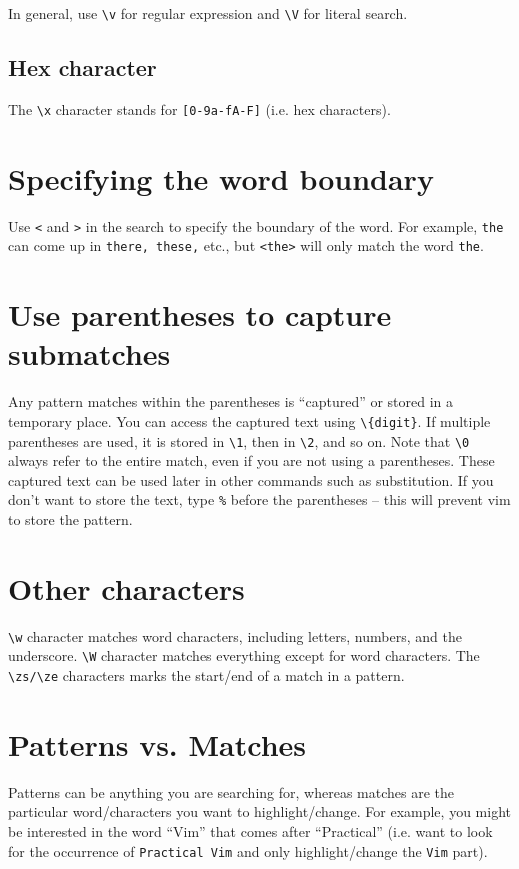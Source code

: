 In general, use \verb|\v| for regular expression and \verb|\V| for literal search.

\subsection{Hex character}

The \verb|\x| character stands for \verb|[0-9a-fA-F]| (i.e. hex characters).

\section{Specifying the word boundary}

Use \verb|<| and \verb|>| in the search to specify the boundary of the word.
For example, \verb|the| can come up in \verb|there, these,| etc., but \verb|<the>| will only match the word \verb|the|.

\section{Use parentheses to capture submatches}

Any pattern matches within the parentheses is ``captured'' or stored in a temporary place.
You can access the captured text using \verb|\{digit}|.
If multiple parentheses are used, it is stored in \verb|\1|, then in \verb|\2|, and so on.
Note that \verb|\0| always refer to the entire match, even if you are not using a parentheses.
These captured text can be used later in other commands such as substitution.
If you don't want to store the text, type \verb|%| before the parentheses -- this will prevent vim to store the pattern.

\section{Other characters}

\verb|\w| character matches word characters, including letters, numbers, and the underscore.
\verb|\W| character matches everything except for word characters.
The \verb|\zs/\ze| characters marks the start/end of a match in a pattern.

\section{Patterns vs. Matches}

Patterns can be anything you are searching for, whereas matches are the particular word/characters you want to highlight/change.
For example, you might be interested in the word ``Vim'' that comes after ``Practical'' (i.e. want to look for the occurrence of \verb|Practical Vim| and only highlight/change the \verb|Vim| part).

